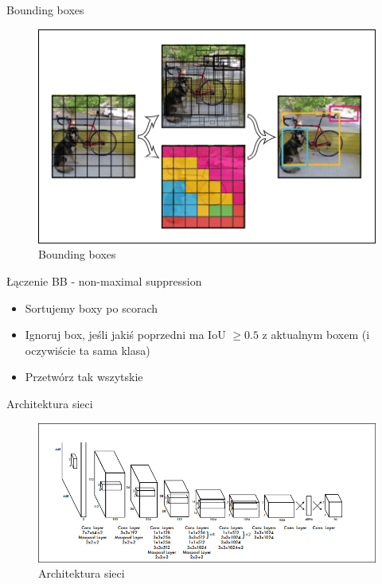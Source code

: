 \documentclass[11pt]{beamer}
\begin{document}
\begin{frame}{Bounding boxes}
\begin{figure}
    \centering
    \includegraphics[width=\textwidth]{grafika/yolo-boxy.png}
    \caption{Bounding boxes}
    \label{fig_boxes}
\end{figure}
\end{frame}

\begin{frame}{Łączenie BB - non-maximal suppression}
\begin{itemize}
    \item Sortujemy boxy po scorach
    \item Ignoruj box, jeśli jakiś poprzedni ma IoU $\geq 0.5$ z aktualnym boxem (i oczywiście ta sama klasa)
    \item Przetwórz tak wszytskie
\end{itemize}
    
\end{frame}


\begin{frame}{Architektura sieci}
\begin{figure}
    \centering
    \includegraphics[width=\textwidth]{grafika/yolo-architektura.png}
    \caption{Architektura sieci}
    \label{fig_architektura}
\end{figure}
\end{frame}
\end{document}
